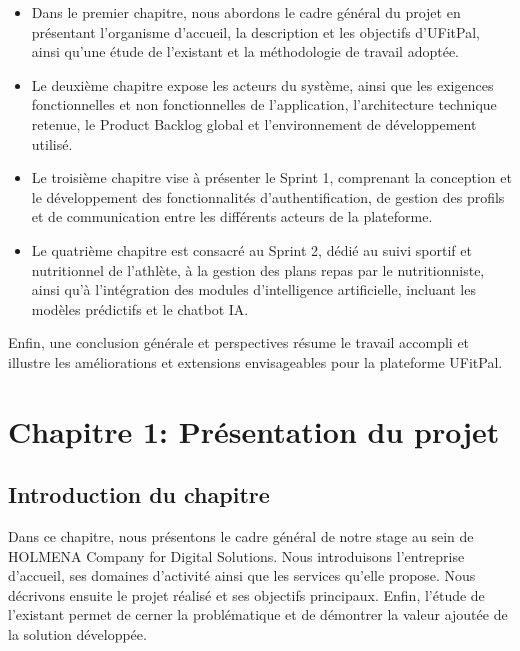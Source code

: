 ﻿\documentclass[a4paper,12pt]{report}
\begin{document}
\begin{itemize}[leftmargin=*, itemsep=4pt]
    \item Dans le premier chapitre, nous abordons le cadre général du projet en présentant l'organisme d'accueil, la description et les objectifs d'UFitPal, ainsi qu'une étude de l'existant et la méthodologie de travail adoptée.
    \item Le deuxième chapitre expose les acteurs du système, ainsi que les exigences fonctionnelles et non fonctionnelles de l'application, l'architecture technique retenue, le Product Backlog global et l'environnement de développement utilisé.
    \item Le troisième chapitre vise à présenter le Sprint 1, comprenant la conception et le développement des fonctionnalités d'authentification, de gestion des profils et de communication entre les différents acteurs de la plateforme.
    \item Le quatrième chapitre est consacré au Sprint 2, dédié au suivi sportif et nutritionnel de l'athlète, à la gestion des plans repas par le nutritionniste, ainsi qu'à l'intégration des modules d'intelligence artificielle, incluant les modèles prédictifs et le chatbot IA.
\end{itemize}

Enfin, une conclusion générale et perspectives résume le travail accompli et illustre les améliorations et extensions envisageables pour la plateforme UFitPal.

\newpage

\chapter*{Chapitre 1: Présentation du projet}  %

\section{Introduction du chapitre}
Dans ce chapitre, nous présentons le cadre général de notre stage au sein de HOLMENA Company for Digital Solutions. Nous introduisons l’entreprise d’accueil, ses domaines d’activité ainsi que les services qu’elle propose. Nous décrivons ensuite le projet réalisé et ses objectifs principaux. Enfin, l’étude de l’existant permet de cerner la problématique et de démontrer la valeur ajoutée de la solution développée.
\end{document}
